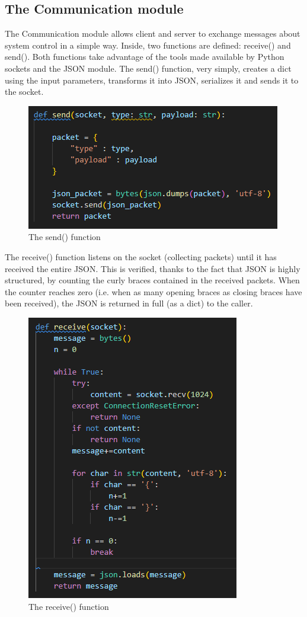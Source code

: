 \documentclass[a4paper,11pt]{report}
\theoremstyle{definition}
\theoremstyle{plain}
\begin{document}
        \subsection{The Communication module}
            The Communication module allows client and server to exchange messages about system control in a simple way. Inside, two functions are defined: receive() and send().
            Both functions take advantage of the tools made available by Python sockets and the JSON module. The send() function, very simply, creates a dict using the input parameters, transforms it into JSON, serializes it and sends it to the socket.
            \begin{figure}[H]
            \includegraphics[scale=0.7]{images/send function.png}
            \centering
            \caption{The send() function}
            \end{figure}
            The receive() function listens on the socket (collecting packets) until it has received the entire JSON. This is verified, thanks to the fact that JSON is highly structured, by counting the curly braces contained in the received packets. When the counter reaches zero (i.e. when as many opening braces as closing braces have been received), the JSON is returned in full (as a dict) to the caller.
            \begin{figure}[H]
            \includegraphics[scale=0.7]{images/receive function.png}
            \centering
            \caption{The receive() function}
            \end{figure}
\end{document}
